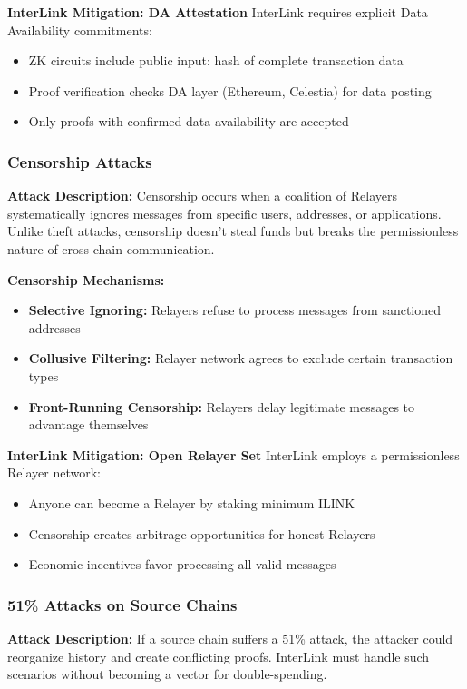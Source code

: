 \documentclass[11pt,a4paper]{article}
\begin{document}
\textbf{InterLink Mitigation: DA Attestation}
InterLink requires explicit Data Availability commitments:
\begin{itemize}
    \item ZK circuits include public input: hash of complete transaction data
    \item Proof verification checks DA layer (Ethereum, Celestia) for data posting
    \item Only proofs with confirmed data availability are accepted
\end{itemize}

\subsubsection{Censorship Attacks}

\textbf{Attack Description:}
Censorship occurs when a coalition of Relayers systematically ignores messages from specific users, addresses, or applications. Unlike theft attacks, censorship doesn't steal funds but breaks the permissionless nature of cross-chain communication.

\textbf{Censorship Mechanisms:}
\begin{itemize}
    \item \textbf{Selective Ignoring:} Relayers refuse to process messages from sanctioned addresses
    \item \textbf{Collusive Filtering:} Relayer network agrees to exclude certain transaction types
    \item \textbf{Front-Running Censorship:} Relayers delay legitimate messages to advantage themselves
\end{itemize}

\textbf{InterLink Mitigation: Open Relayer Set}
InterLink employs a permissionless Relayer network:
\begin{itemize}
    \item Anyone can become a Relayer by staking minimum ILINK
    \item Censorship creates arbitrage opportunities for honest Relayers
    \item Economic incentives favor processing all valid messages
\end{itemize}

\subsubsection{51\% Attacks on Source Chains}

\textbf{Attack Description:}
If a source chain suffers a 51\% attack, the attacker could reorganize history and create conflicting proofs. InterLink must handle such scenarios without becoming a vector for double-spending.
\end{document}

